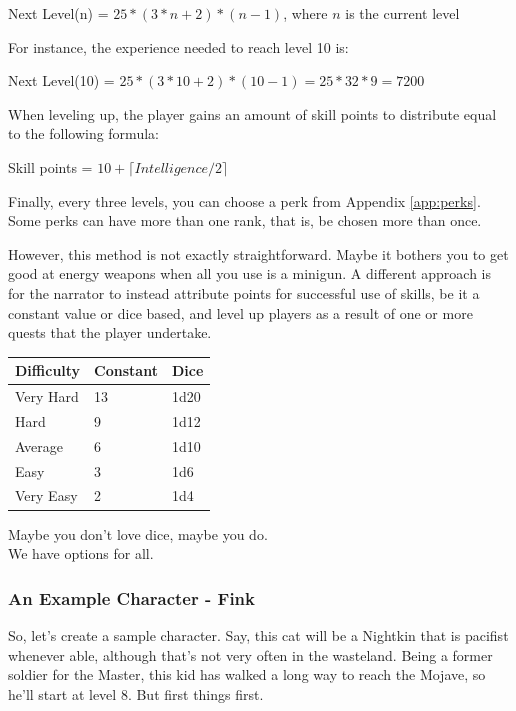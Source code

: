 \documentclass[11pt]{article} %
\begin{document}
\begin{center}
Next Level(n) = $25 * (3 * n + 2) * (n - 1)$, where $n$ is the current level
\end{center}

For instance, the experience needed to reach level 10 is:

\begin{center}
Next Level(10) = $25 * (3 * 10 + 2) * (10 - 1) = 25 * 32 * 9 = 7200$
\end{center}

When leveling up, the player gains an amount of skill points to distribute equal to the following formula:
    
\begin{center}
Skill points = $10 + \lceil Intelligence / 2 \rceil$
\end{center}

Finally, every three levels, you can choose a perk from Appendix \ref{app:perks}. Some perks can have more than one rank, that is, be chosen more than once.

However, this method is not exactly straightforward. Maybe it bothers you to get good at energy weapons when all you use is a minigun. A different approach is for the narrator to instead attribute points for successful use of skills, be it a constant value or dice based, and level up players as a result of one or more quests that the player undertake.

\begin{longtable}{|p{2.8cm}|p{1.8cm}|p{1.8cm}|}
\hline
\bfseries Difficulty & \bfseries Constant & \bfseries Dice \\
\hline
\endhead
Very Hard & 13 & 1d20 \\
Hard  & 9 & 1d12 \\
Average & 6 &  1d10 \\
Easy & 3 & 1d6 \\
Very Easy & 2 & 1d4 \\
\hline
\end{longtable}{\begin{center}Maybe you don't love dice, maybe you do. \\ We have options for all.\end{center}}

\subsubsection{An Example Character - Fink}

So, let's create a sample character. Say, this cat will be a Nightkin that is pacifist whenever able, although that's not very often in the wasteland. Being a former soldier for the Master, this kid has walked a long way to reach the Mojave, so he'll start at level 8. But first things first.
\end{document}
